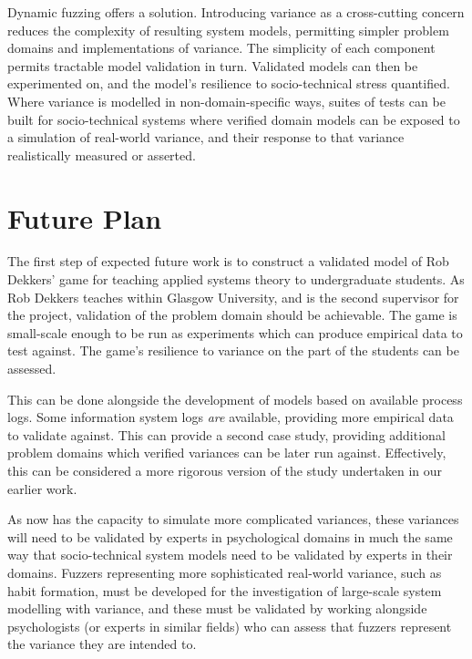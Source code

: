 \documentclass[draft]{article}
\begin{document}
Dynamic fuzzing offers a solution. Introducing variance as a cross-cutting
concern reduces the complexity of resulting system models, permitting simpler
problem domains and implementations of variance. The simplicity of each
component permits tractable model validation in turn. Validated models can then
be experimented on, and the model's resilience to socio-technical stress
quantified. Where variance is modelled in non-domain-specific ways, suites of
tests can be built for socio-technical systems where verified domain models can
be exposed to a simulation of real-world variance, and their response to that
variance realistically measured or asserted.\par



\section{Future Plan}
\label{sec:future_plan}

The first step of expected future work is to construct a validated model of Rob
Dekkers' game for teaching applied systems theory to undergraduate students.
As Rob Dekkers teaches within Glasgow University, and is the second supervisor
for the project, validation of the problem domain should be achievable. The game
is small-scale enough to be run as experiments which can produce empirical data
to test against. The game's resilience to variance on the part of the students
can be assessed.\par

This can be done alongside the development of models based on available process
logs. Some information system logs \emph{are} available, providing more
empirical data to validate against. This can provide a second case study,
providing additional problem domains which verified variances can be later run
against. Effectively, this can be considered a more rigorous version of the
study undertaken in our earlier work\cite{caise_forum_18}.\par


As \pdsf{} now has the capacity to simulate more complicated variances, these
variances will need to be validated by experts in psychological domains in much
the same way that socio-technical system models need to be validated by experts
in their domains. Fuzzers representing more sophisticated real-world variance,
such as habit formation, must be developed for the investigation of large-scale
system modelling with variance, and these must be validated by working alongside
psychologists (or experts in similar fields) who can assess that fuzzers
represent the variance they are intended to.\par
\end{document}
